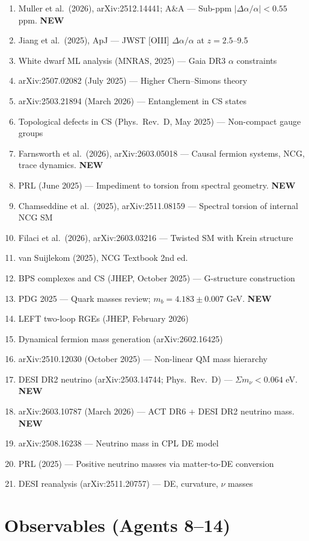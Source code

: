 \documentclass[11pt,a4paper]{article}
\newcommand{\NEW}{\textcolor{dfdblue}{\textbf{NEW}}}
\begin{document}
\begin{enumerate}
\item Muller et al.\ (2026), arXiv:2512.14441; A\&A --- Sub-ppm $|\Delta\alpha/\alpha| < 0.55$ ppm. \NEW
\item Jiang et al.\ (2025), ApJ --- JWST [OIII] $\Delta\alpha/\alpha$ at $z = 2.5$--9.5
\item White dwarf ML analysis (MNRAS, 2025) --- Gaia DR3 $\alpha$ constraints
\item arXiv:2507.02082 (July 2025) --- Higher Chern--Simons theory
\item arXiv:2503.21894 (March 2026) --- Entanglement in CS states
\item Topological defects in CS (Phys.\ Rev.\ D, May 2025) --- Non-compact gauge groups
\item Farnsworth et al.\ (2026), arXiv:2603.05018 --- Causal fermion systems, NCG, trace dynamics. \NEW
\item PRL (June 2025) --- Impediment to torsion from spectral geometry. \NEW
\item Chamseddine et al.\ (2025), arXiv:2511.08159 --- Spectral torsion of internal NCG SM
\item Filaci et al.\ (2026), arXiv:2603.03216 --- Twisted SM with Krein structure
\item van Suijlekom (2025), NCG Textbook 2nd ed.
\item BPS complexes and CS (JHEP, October 2025) --- G-structure construction
\item PDG 2025 --- Quark masses review; $m_b = 4.183 \pm 0.007$ GeV. \NEW
\item LEFT two-loop RGEs (JHEP, February 2026)
\item Dynamical fermion mass generation (arXiv:2602.16425)
\item arXiv:2510.12030 (October 2025) --- Non-linear QM mass hierarchy
\item DESI DR2 neutrino (arXiv:2503.14744; Phys.\ Rev.\ D) --- $\Sigma m_\nu < 0.064$ eV. \NEW
\item arXiv:2603.10787 (March 2026) --- ACT DR6 + DESI DR2 neutrino mass. \NEW
\item arXiv:2508.16238 --- Neutrino mass in CPL DE model
\item PRL (2025) --- Positive neutrino masses via matter-to-DE conversion
\item DESI reanalysis (arXiv:2511.20757) --- DE, curvature, $\nu$ masses
\end{enumerate}

\section{Observables (Agents 8--14)}
\end{document}
